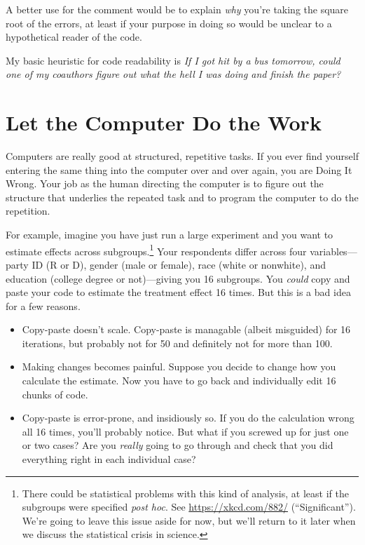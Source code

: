 \documentclass[12pt,oneside,openany]{book}
\begin{document}
A better use for the comment would be to explain \emph{why} you're
taking the square root of the errors, at least if your purpose in doing
so would be unclear to a hypothetical reader of the code.

My basic heuristic for code readability is \emph{If I got hit by a bus
tomorrow, could one of my coauthors figure out what the hell I was doing
and finish the paper?}

\section{Let the Computer Do the
Work}\label{let-the-computer-do-the-work}

Computers are really good at structured, repetitive tasks. If you ever
find yourself entering the same thing into the computer over and over
again, you are Doing It Wrong. Your job as the human directing the
computer is to figure out the structure that underlies the repeated task
and to program the computer to do the repetition.

For example, imagine you have just run a large experiment and you want
to estimate effects across subgroups.\footnote{There could be
  statistical problems with this kind of analysis, at least if the
  subgroups were specified \emph{post hoc}. See
  \url{https://xkcd.com/882/} (``Significant''). We're going to leave
  this issue aside for now, but we'll return to it later when we discuss
  the statistical crisis in science.} Your respondents differ across
four variables---party ID (R or D), gender (male or female), race (white
or nonwhite), and education (college degree or not)---giving you 16
subgroups. You \emph{could} copy and paste your code to estimate the
treatment effect 16 times. But this is a bad idea for a few reasons.

\begin{itemize}
\item
  Copy-paste doesn't scale. Copy-paste is managable (albeit misguided)
  for 16 iterations, but probably not for 50 and definitely not for more
  than 100.
\item
  Making changes becomes painful. Suppose you decide to change how you
  calculate the estimate. Now you have to go back and individually edit
  16 chunks of code.
\item
  Copy-paste is error-prone, and insidiously so. If you do the
  calculation wrong all 16 times, you'll probably notice. But what if
  you screwed up for just one or two cases? Are you \emph{really} going
  to go through and check that you did everything right in each
  individual case?
\end{itemize}
\end{document}
